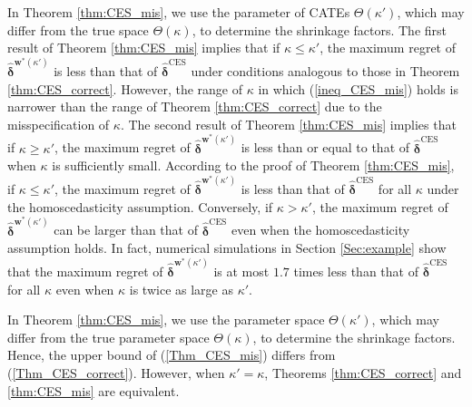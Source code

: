 \documentclass[12pt,a4paper]{article}
\begin{document}
In Theorem \ref{thm:CES_mis}, we use the parameter of CATEs $\Theta (\kappa')$, which may differ from the true space $\Theta(\kappa)$, to determine the shrinkage factors. The first result of Theorem \ref{thm:CES_mis} implies that if $\kappa \leq \kappa'$, the maximum regret of $\hat{\bm{\delta}}^{\bm{w}^{\ast}(\kappa')}$ is less than that of $\hat{\bm{\delta}}^{\mathrm{CES}}$ under conditions analogous to those in Theorem \ref{thm:CES_correct}. However, the range of $\kappa$ in which (\ref{ineq_CES_mis}) holds is narrower than the range of Theorem \ref{thm:CES_correct} due to the misspecification of $\kappa$. The second result of Theorem \ref{thm:CES_mis} implies that if $\kappa \geq \kappa'$, the maximum regret of $\hat{\bm{\delta}}^{\bm{w}^{\ast}(\kappa')}$ is less than or equal to that of $\hat{\bm{\delta}}^{\mathrm{CES}}$ when $\kappa$ is sufficiently small. According to the proof of Theorem \ref{thm:CES_mis}, if $\kappa \leq \kappa'$, the maximum regret of $\hat{\bm{\delta}}^{\bm{w}^{\ast}(\kappa')}$ is less than that of $\hat{\bm{\delta}}^{\mathrm{CES}}$ for all $\kappa$ under the homoscedasticity assumption. Conversely, if $\kappa > \kappa'$, the maximum regret of $\hat{\bm{\delta}}^{\bm{w}^{\ast}(\kappa')}$ can be larger than that of $\hat{\bm{\delta}}^{\mathrm{CES}}$ even when the homoscedasticity assumption holds. In fact, numerical simulations in Section \ref{Sec:example} show that the maximum regret of $\hat{\bm{\delta}}^{\bm{w}^{\ast}(\kappa')}$ is at most $1.7$ times less than that of $\hat{\bm{\delta}}^{\mathrm{CES}}$ for all $\kappa$ even when $\kappa$ is twice as large as $\kappa'$.

In Theorem \ref{thm:CES_mis}, we use the parameter space $\Theta (\kappa')$, which may differ from the true parameter space $\Theta(\kappa)$, to determine the shrinkage factors. Hence, the upper bound of (\ref{Thm_CES_mis}) differs from (\ref{Thm_CES_correct}). However, when $\kappa' = \kappa$, Theorems \ref{thm:CES_correct} and \ref{thm:CES_mis} are equivalent.
\end{document}

